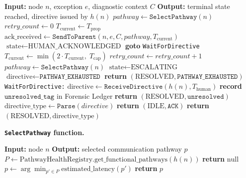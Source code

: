 \begin{algorithm}[htbp]
\caption{Escalation Algorithm $\texttt{Escalate}(n, e, C)$}
\label{alg:escalate}
\begin{algorithmic}
\STATE \textbf{Input:} node $n$, exception $e$, diagnostic context $C$
\STATE \textbf{Output:} terminal state reached, directive issued by $h(n)$
\STATE
\STATE $pathway \leftarrow \texttt{SelectPathway}(n)$
\STATE $retry\_count \leftarrow 0$
\STATE $T_{\text{current}} \leftarrow T_{\text{prop}}$
\STATE
{}
    \STATE $\text{ack\_received} \leftarrow \texttt{SendToParent}(n, e, C, pathway, T_{\text{current}})$
        \STATE $\text{state} \leftarrow \text{HUMAN\_ACKNOWLEDGED}$
        \STATE \textbf{goto} \texttt{WaitForDirective}
    \ENDIF
    \STATE $T_{\text{current}} \leftarrow \min(2 \cdot T_{\text{current}},\; T_{\text{cap}})$
    \STATE $retry\_count \leftarrow retry\_count + 1$
    \STATE $pathway \leftarrow \texttt{SelectPathway}(n)$ 
\ENDWHILE
\STATE
\STATE {}
\STATE $\text{state} \leftarrow \text{ESCALATING}$
\STATE $\text{directive} \leftarrow \texttt{PATHWAY\_EXHAUSTED}$
\STATE \textbf{return} $(\text{RESOLVED}, \texttt{PATHWAY\_EXHAUSTED})$
\STATE
\STATE \texttt{WaitForDirective:}
\STATE $\text{directive} \leftarrow \texttt{ReceiveDirective}(h(n), T_{\text{human}})$
    \STATE \textbf{record} $\texttt{unresolved\_tag}$ in Forensic Ledger
    \STATE \textbf{return} $(\text{RESOLVED}, \texttt{unresolved})$
\ENDIF
\STATE $\text{directive\_type} \leftarrow \texttt{Parse}(directive)$
    \STATE \textbf{return} $(\text{IDLE}, \texttt{ACK})$
    \STATE \textbf{return} $(\text{RESOLVED}, \text{directive\_type})$
\ENDIF
\end{algorithmic}
\end{algorithm}

\medskip
\noindent\textbf{\texttt{SelectPathway} function.}
\begin{algorithmic}
\STATE \textbf{Input:} node $n$
\STATE \textbf{Output:} selected communication pathway $p$
\STATE
\STATE $P \leftarrow \text{PathwayHealthRegistry.get\_functional\_pathways}(h(n))$
\STATE {}
    \STATE \textbf{return} $\text{null}$ 
\ENDIF
\STATE $p \leftarrow \arg\min_{p' \in P} \text{estimated\_latency}(p')$
\STATE \textbf{return} $p$
\end{algorithmic}

